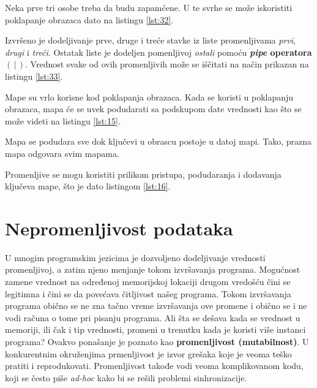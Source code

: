 \documentclass[12pt,oneside]{memoir}
\begin{document}
Neka prve tri osobe treba da budu zapamćene. U te svrhe se može iskoristiti poklapanje obrazaca dato na listingu \ref{lst:32}.



Izvršeno je dodeljivanje prve, druge i treće stavke iz liste promenljivama \textit{prvi}, \textit{drugi} i \textit{treći}. Ostatak liste je dodeljen pomenljivoj \textit{ostali} pomoću \textbf{\textit{pipe} operatora $(\,|\,)$}. Vrednost svake od ovih promenljivih može se iščitati na način prikazan na listingu \ref{lst:33}.



Mape su vrlo korisne kod poklapanja obrazaca. Kada se koristi u poklapanju obrazaca, mapa će se uvek podudarati sa podskupom date vrednosti kao što se može videti na listingu \ref{lst:15}.
 


\noindent Mapa se podudara sve dok ključevi u obrascu postoje u datoj mapi. Tako, prazna mapa odgovara svim mapama.

Promenljive se mogu koristiti prilikom pristupa, podudaranja i dodavanja ključeva mape, što je dato listingom \ref{lst:16}.



\section{Nepromenljivost podataka}
\label{odeljak:nepromenljivostPodataka}

U mnogim programskim jezicima je dozvoljeno dodeljivanje vrednosti promenljivoj, a zatim njeno menjanje tokom izvršavanja programa. Mogućnost zamene vrednost na određenoj memorijskoj lokaciji drugom vredošću čini se legitimna i čini se da povećava čitljivost našeg programa. Tokom izvršavanja programa obično se ne zna tačno vreme izvršavanja ove promene i obično se i ne vodi računa o tome pri pisanju programa. Ali šta se dešava kada se vrednost u memoriji, ili čak i tip vrednosti, promeni u trenutku kada je koristi više instanci programa?  Ovakvo ponašanje je poznato kao \textbf{promenljivost (mutabilnost)}. U konkurentnim okruženjima prmenljivost je izvor grešaka koje je veoma teško pratiti i reprodukovati. Promenljivost takođe vodi veoma komplikovanom kodu, koji se često piše \textit{ad-hoc} kako bi se rešili problemi sinhronizacije.
\end{document}
